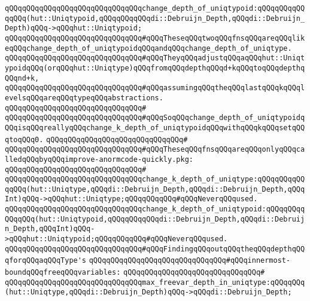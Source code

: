 \verb|qQQqqQQqqQQqqQQqqQQqqQQqqQQqqQQqchange_depth_of_uniqtypoid:qQQqqQQqqQQqqQQq(hut::Uniqtypoid,qQQqqQQqqQQqdi::Debruijn_Depth,qQQqdi::Debruijn_Depth)qQQq->qQQqhut::Uniqtypoid;|\newline
\newline
\verb|qQQqqQQqqQQqqQQqqQQqqQQqqQQqqQQq#qQQqTheseqQQqtwoqQQqfnsqQQqareqQQqlikeqQQqchange_depth_of_uniqtypoidqQQqandqQQqchange_depth_of_uniqtype.|\newline
\verb|qQQqqQQqqQQqqQQqqQQqqQQqqQQqqQQq#qQQqTheyqQQqadjustqQQqaqQQqhut::UniqtypoidqQQq(orqQQqhut::Uniqtype)qQQqfromqQQqdepthqQQqd+kqQQqtoqQQqdepthqQQqnd+k,|\newline
\verb|qQQqqQQqqQQqqQQqqQQqqQQqqQQqqQQq#qQQqassumingqQQqtheqQQqlastqQQqkqQQqlevelsqQQqareqQQqtypeqQQqabstractions.|\newline
\verb|qQQqqQQqqQQqqQQqqQQqqQQqqQQqqQQq#|\newline
\verb|qQQqqQQqqQQqqQQqqQQqqQQqqQQqqQQq#qQQqSoqQQqchange_depth_of_uniqtypoidqQQqisqQQqreallyqQQqchange_k_depth_of_uniqtypoidqQQqwithqQQqkqQQqsetqQQqtoqQQq0.|\newline
\verb|qQQqqQQqqQQqqQQqqQQqqQQqqQQqqQQq#|\newline
\verb|qQQqqQQqqQQqqQQqqQQqqQQqqQQqqQQq#qQQqTheseqQQqfnsqQQqareqQQqonlyqQQqcalledqQQqbyqQQqimprove-anormcode-quickly.pkg:|\newline
\verb|qQQqqQQqqQQqqQQqqQQqqQQqqQQqqQQq#|\newline
\verb|qQQqqQQqqQQqqQQqqQQqqQQqqQQqqQQqchange_k_depth_of_uniqtype:qQQqqQQqqQQqqQQq(hut::Uniqtype,qQQqdi::Debruijn_Depth,qQQqdi::Debruijn_Depth,qQQqInt)qQQq->qQQqhut::Uniqtype;qQQqqQQqqQQq#qQQqNeverqQQqused.|\newline
\verb|qQQqqQQqqQQqqQQqqQQqqQQqqQQqqQQqchange_k_depth_of_uniqtypoid:qQQqqQQqqQQqqQQq(hut::Uniqtypoid,qQQqqQQqqQQqdi::Debruijn_Depth,qQQqdi::Debruijn_Depth,qQQqInt)qQQq->qQQqhut::Uniqtypoid;qQQqqQQqqQQq#qQQqNeverqQQqused.|\newline
\newline
\verb|qQQqqQQqqQQqqQQqqQQqqQQqqQQqqQQq#qQQqFindingqQQqoutqQQqtheqQQqdepthqQQqforqQQqaqQQqType's|\newline
\verb|qQQqqQQqqQQqqQQqqQQqqQQqqQQqqQQq#qQQqinnermost-boundqQQqfreeqQQqvariables:|\newline
\verb|qQQqqQQqqQQqqQQqqQQqqQQqqQQqqQQq#|\newline
\verb|qQQqqQQqqQQqqQQqqQQqqQQqqQQqqQQqmax_freevar_depth_in_uniqtype:qQQqqQQq(hut::Uniqtype,qQQqdi::Debruijn_Depth)qQQq->qQQqdi::Debruijn_Depth;|\newline
